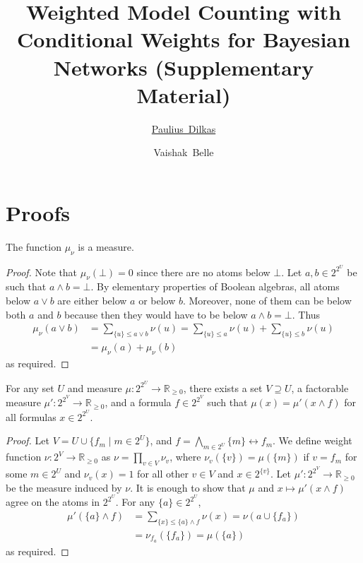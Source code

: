 \documentclass[accepted]{uai2021}
\title{Weighted Model Counting with Conditional Weights for Bayesian Networks
  (Supplementary Material)}
\author[1]{\href{mailto:Paulius Dilkas <p.dilkas@sms.ed.ac.uk>?Subject=Your UAI
    2021 paper}{Paulius~Dilkas}{}}
\author[1,2]{Vaishak~Belle}
\affil[1]{%
  School of Informatics\\
  University of Edinburgh\\
  Edinburgh, UK
}
\affil[2]{%
  Alan Turing Institute\\
  London, UK
}
\newenvironment{customthm}[1]
{\renewcommand\theinnercustomthm{#1}\innercustomthm}
{\endinnercustomthm}
\begin{document}
\maketitle

\section{Proofs}

\begin{customthm}{1}
  The function $\mu_\nu$ is a measure.
\end{customthm}
\begin{proof}
  Note that $\mu_\nu(\bot) = 0$ since there are no atoms below $\bot$. Let $a, b
  \in 2^{2^{U}}$ be such that $a \land b = \bot$. By elementary properties of
  Boolean algebras, all atoms below $a \lor b$ are either below $a$ or below
  $b$. Moreover, none of them can be below both $a$ and $b$ because then they
  would have to be below $a \land b = \bot$. Thus
  \begin{align*}
    \mu_\nu(a \lor b) &= \sum_{\{u\} \le a \lor b} \nu(u) = \sum_{\{u\} \le a} \nu(u) + \sum_{\{u\} \le b} \nu(u) \\
                      &= \mu_\nu(a) + \mu_\nu(b)
  \end{align*}
  as required.
\end{proof}

\begin{customthm}{3}
  For any set $U$ and measure $\mu\colon 2^{2^U} \to \mathbb{R}_{\ge 0}$, there
  exists a set $V \supseteq U$, a factorable measure $\mu'\colon 2^{2^V} \to
  \mathbb{R}_{\ge 0}$, and a formula $f \in 2^{2^V}$ such that $\mu(x) = \mu'(x
  \land f)$ for all formulas $x \in 2^{2^U}$.
\end{customthm}
\begin{proof}
  Let $V = U \cup \{ f_m \mid m \in 2^U \}$, and $f = \bigwedge_{m \in 2^U} \{ m
  \} \leftrightarrow f_m$. We define weight function $\nu\colon 2^V \to
  \mathbb{R}_{\ge 0}$ as $\nu = \prod_{v \in V} \nu_v$, where $\nu_v(\{v\}) =
  \mu(\{m\})$ if $v = f_m$ for some $m \in 2^U$ and $\nu_v(x) = 1$ for all other
  $v \in V$ and $x \in 2^{\{v\}}$. Let $\mu'\colon 2^{2^V} \to \mathbb{R}_{\ge
    0}$ be the measure induced by $\nu$. It is enough to show that $\mu$ and $x
  \mapsto \mu'(x \land f)$ agree on the atoms in $2^{2^U}$. For any $\{ a \} \in
  2^{2^U}$,
  \begin{align*}
    \mu'(\{ a \} \land f) &= \sum_{\{ x \} \le \{ a \} \land f} \nu(x) = \nu(a \cup \{ f_a \}) \\
                          &= \nu_{f_a}(\{ f_a \}) = \mu(\{ a \})
  \end{align*}
  as required.
\end{proof}
\end{document}
